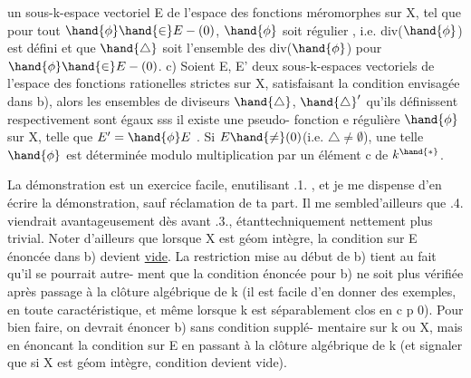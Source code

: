 
un sous-k-espace vectoriel E de l'espace des  fonctions  méromorphes  
sur X, tel que pour tout $\hand{\phi} \hand{\in} E-(0)$, $\hand{\phi}$ soit régulier 
  , i.e. div($\hand{\phi}$) est défini 
\hand{\unsure{,|)}} et que $\hand{\triangle}$ soit l'ensemble des div($\hand{\phi}$) pour $\hand{\phi} \hand{\in} E-(0)$.
c) Soient E, E' deux sous-k-espaces vectoriels de l'espace des
fonctions rationelles strictes  sur X,  satisfaisant la condition
envisagée dans b), alors les ensembles de diviseurs $\hand{\triangle}$, $\hand{\triangle}'$ qu'ils
définissent respectivement sont égaux sss il existe une pseudo- fonction
e  régulière $\hand{\phi}$ sur X, telle que $E' = \hand{\phi} E$ . Si $E\hand{\neq}(0)$(i.e. $\triangle \neq \emptyset$), une
telle $\hand{\phi}$ est déterminée modulo multiplication par un élément c de $k^{\hand{*}}$.

La démonstration est un exercice facile, enutilisant .1. , et je
me dispense d'en écrire la démonstration, sauf réclamation de ta part. Il
\placedmargin{||} me sembled'ailleurs que .4. viendrait avantageusement dès avant .3.,
étanttechniquement nettement plus trivial. Noter d'ailleurs que lorsque
X est géom intègre, la condition sur E énoncée dans b) devient \uline{vide}.
La restriction mise au début de b) tient au fait qu'il se pourrait autre-%
ment que la condition énoncée pour b) ne soit plus vérifiée après passage
à la clôture algébrique de k (il est facile d'en donner des exemples,
en toute caractéristique, et même lorsque k est séparablement clos en
c p \hand{$>$} 0). Pour bien faire, on devrait énoncer b) sans condition supplé-%
mentaire sur k ou X, mais en énoncant la condition sur E en passant à la
clôture algébrique de k (et signaler que si X est géom intègre, 
condition devient vide). 

